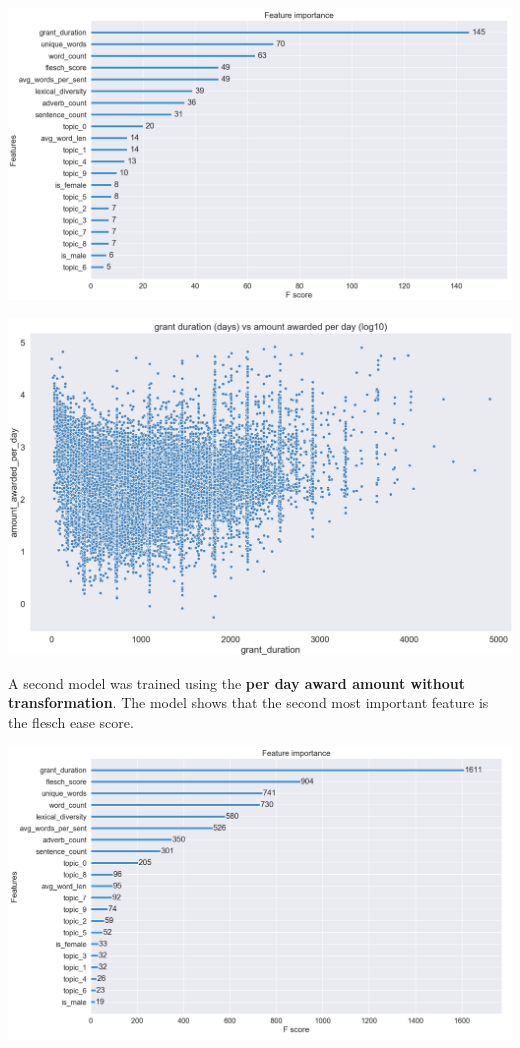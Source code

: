 \documentclass[11pt, oneside]{article}   	%
\begin{document}
 \includegraphics[width=\textwidth]{xgbLogAwardPerDay}
 
  \includegraphics[width=\textwidth]{xgbScatterAwardPerDay}

A second model was trained using the \textbf{per day award amount without transformation}. The model shows that the second most important feature is the flesch ease score.

\includegraphics[width=\textwidth]{xgbAwardPerDay}
\end{document}
